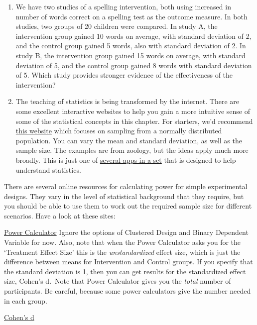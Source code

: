 \documentclass{krantz}
\begin{document}
\begin{enumerate}
\def\labelenumi{\arabic{enumi}.}
\item
  We have two studies of a spelling intervention, both using increased in number of words correct on a spelling test as the outcome measure. In both studies, two groups of 20 children were compared. In study A, the intervention group gained 10 words on average, with standard deviation of 2, and the control group gained 5 words, also with standard deviation of 2. In study B, the intervention group gained 15 words on average, with standard deviation of 5, and the control group gained 8 words with standard deviation of 5. Which study provides stronger evidence of the effectiveness of the intervention?
\item
  The teaching of statistics is being transformed by the internet. There are some excellent interactive websites to help you gain a more intuitive sense of some of the statistical concepts in this chapter. For starters, we'd recommend \href{https://www.zoology.ubc.ca/~whitlock/Kingfisher/SamplingNormal.htm}{this website} which focuses on sampling from a normally distributed population. You can vary the mean and standard deviation, as well as the sample size. The examples are from zoology, but the ideas apply much more broadly. This is just one of \href{https://whitlockschluter.zoology.ubc.ca/stats-visualizations}{several apps in a set} that is designed to help understand statistics.
\end{enumerate}

There are several online resources for calculating power for simple experimental designs. They vary in the level of statistical background that they require, but you should be able to use them to work out the required sample size for different scenarios. Have a look at these sites:

\href{https://egap.shinyapps.io/Power_Calculator/}{Power Calculator} Ignore the options of Clustered Design and Binary Dependent Variable for now. Also, note that when the Power Calculator asks you for the `Treatment Effect Size' this is the \emph{unstandardized} effect size, which is just the difference between means for Intervention and Control groups. If you specify that the standard deviation is 1, then you can get results for the standardized effect size, Cohen's d.~Note that Power Calculator gives you the \emph{total} number of participants. Be careful, because some power calculators give the number needed in each group.

\href{https://shiny.ieis.tue.nl/d_p_power/}{Cohen's d}
\end{document}

